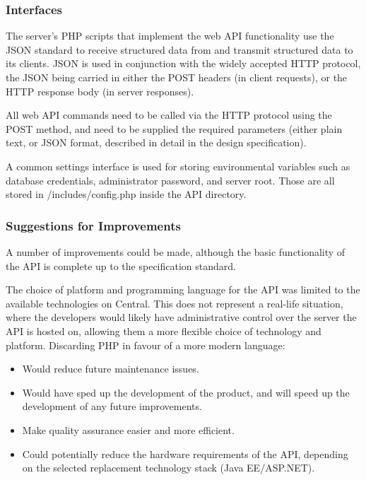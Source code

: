     \subsubsection{Interfaces}
        The server's PHP scripts that implement the web API functionality use the JSON standard to receive structured data from and transmit structured data to its clients. JSON is used in conjunction with the widely accepted HTTP protocol, the JSON being carried in either the POST headers (in client requests), or the HTTP response body (in server responses).
    
        All web API commands need to be called via the HTTP protocol using the POST method, and need to be supplied the required parameters (either plain text, or JSON format, described in detail in the design specification).
        
        A common settings interface is used for storing environmental variables such as database credentials, administrator password, and server root. Those are all stored in /includes/config.php inside the API directory.

    \subsubsection{Suggestions for Improvements}

        A number of improvements could be made, although the basic functionality of the API is complete up to the specification standard.
    
        The choice of platform and programming language for the API was limited to the available technologies on Central. This does not represent a real-life situation, where the developers would likely have administrative control over the server the API is hosted on, allowing them a more flexible choice of technology and platform. Discarding PHP in favour of a more modern
        language: 
        \begin{itemize}
            \item Would reduce future maintenance issues.
            \item Would have sped up the development of the product, and will speed up the development of any future improvements.
            \item Make quality assurance easier and more efficient.
            \item Could potentially reduce the hardware requirements of the API, depending on the selected replacement technology stack (Java EE/ASP.NET).
        \end{itemize}

